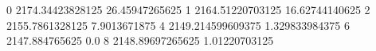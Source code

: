0 2174.34423828125 26.45947265625
1 2164.51220703125 16.62744140625
2 2155.7861328125 7.9013671875
4 2149.214599609375 1.329833984375
6 2147.884765625 0.0
8 2148.89697265625 1.01220703125
